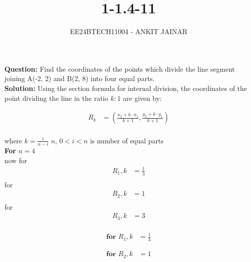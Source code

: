 \documentclass[journal]{IEEEtran}
\begin{document}

\vspace{3cm}


\title{1-1.4-11}
\author{EE24BTECH11004 - ANKIT JAINAR
}
{\let\newpage\relax\maketitle}

\renewcommand{\thefigure}{\theenumi}
\renewcommand{\thetable}{\theenumi}
\setlength{\intextsep}{10pt} %


\renewcommand{\thetable}{\theenumi}

\textbf{Question:} Find the coordinates of the points which divide the line segment joining A(-2, 2) and B(2, 8) into four equal parts.\\

\textbf{Solution:} Using the section formula for internal division, the coordinates of the point dividing the line in the ratio $k:1$ are given by:

\begin{align}
R_k &= \left( \frac{x_2  + k \cdot x_1}{k+1}, \frac{ y_2 + k \cdot y_1}{k+1} \right)
\end{align} 
\\where $k = \frac{i}{n-i}$ $n$, $0<i<n$ is number of equal parts \\

\textbf{For} $n = 4$ \\


now for
\begin{align}
R_1,k&=\frac{1}{3}\\
\end{align}
for \begin{align}
R_2,k&=1\\
\end{align}
for 
\begin{align}
R_3,k&=3\\
\end{align}

\begin{align}
\textbf{for $R_1$},k&=\frac{1}{3}
\end{align}

\begin{align}	
\textbf{for $R_2$},k&=1
\end{align}
\end{document}
